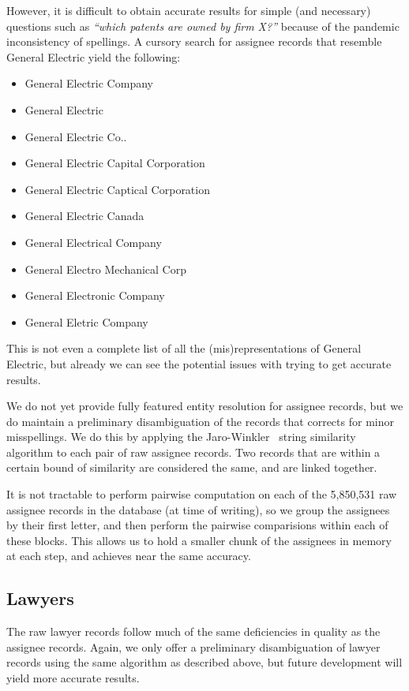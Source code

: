 However, it is difficult to obtain accurate results for simple (and necessary)
questions such as \emph{``which patents are owned by firm X?''} because of the
pandemic inconsistency of spellings. A cursory search for assignee records that
resemble General Electric yield the following:

\begin{itemize}
    \item General Electric Company
    \item General Electric
    \item General Electric Co..
    \item General Electric Capital Corporation
    \item General Electric Captical Corporation
    \item General Electric Canada
    \item General Electrical Company
    \item General Electro Mechanical Corp
    \item General Electronic Company
    \item General Eletric Company
\end{itemize}

This is not even a complete list of all the (mis)representations of General
Electric, but already we can see the potential issues with trying to get
accurate results.

We do not yet provide fully featured entity resolution for assignee records,
but we do maintain a preliminary disambiguation of the records that corrects
for minor misspellings. We do this by applying the Jaro-Winkler~\cite{jw}
string similarity algorithm to each pair of raw assignee records. Two records
that are within a certain bound of similarity are considered the same, and are
linked together.

It is not tractable to perform pairwise computation on each of the 5,850,531
raw assignee records in the database (at time of writing), so we group the
assignees by their first letter, and then perform the pairwise comparisions
within each of these blocks. This allows us to hold a smaller chunk of the
assignees in memory at each step, and achieves near the same accuracy.

\subsection{Lawyers}

The raw lawyer records follow much of the same deficiencies in quality as the
assignee records. Again, we only offer a preliminary disambiguation of lawyer
records using the same algorithm as described above, but future development
will yield more accurate results.

